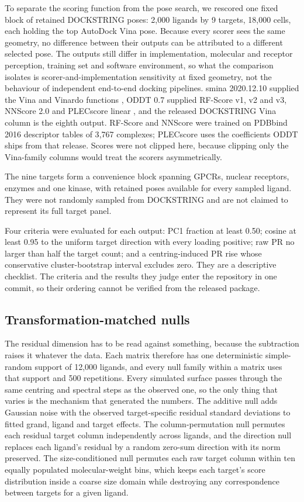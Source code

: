 To separate the scoring function from the pose search, we rescored one fixed block of retained
DOCKSTRING poses: 2{,}000 ligands by 9 targets, 18{,}000 cells, each holding the top AutoDock
Vina pose. Because every scorer sees the same geometry, no difference between their outputs
can be attributed to a different selected pose. The outputs still differ in implementation,
molecular and receptor perception, training set and software environment, so what the
comparison isolates is scorer-and-implementation sensitivity at fixed geometry, not the
behaviour of independent end-to-end docking pipelines. smina 2020.12.10 supplied
the Vina and Vinardo functions \cite{smina2013,vinardo2016}, ODDT 0.7 supplied RF-Score v1, v2
and v3, NNScore 2.0 and PLECscore linear
\cite{oddt2015,rfscore2010,ballester2014rfscore,nnscore2011,plecscore2019}, and the released
DOCKSTRING Vina column is the eighth output. RF-Score and NNScore were trained on PDBbind 2016
descriptor tables of 3{,}767 complexes; PLECscore uses the coefficients ODDT ships from that
release. Scores were not clipped here, because clipping only the Vina-family columns would treat
the scorers asymmetrically.

The nine targets form a convenience block spanning GPCRs, nuclear receptors, enzymes and one
kinase, with retained poses available for every sampled ligand. They were not randomly sampled from
DOCKSTRING and are not claimed to represent its full target panel.

Four criteria were evaluated for each output: PC1 fraction at least 0.50; cosine at least 0.95 to
the uniform target direction with every loading positive; raw PR no larger than half the target
count; and a centring-induced PR rise whose conservative cluster-bootstrap interval excludes
zero. They are a descriptive checklist. The criteria and the results they judge enter the
repository in one commit, so their ordering cannot be verified from the released package.

\subsection{Transformation-matched nulls}

The residual dimension has to be read against something, because the subtraction raises it
whatever the data. Each matrix therefore has one deterministic simple-random support of 12{,}000
ligands, and every null family within a matrix uses that support and 500 repetitions. Every
simulated surface passes through the same centring and spectral steps as the observed one, so
the only thing that varies is the mechanism that generated the numbers. The additive null adds
Gaussian noise with the observed target-specific residual standard deviations to fitted grand,
ligand and target effects. The column-permutation null permutes each residual target column
independently across ligands, and the direction null replaces each ligand's residual by a random
zero-sum direction with its norm preserved. The size-conditioned null permutes each raw target
column within ten equally populated molecular-weight bins, which keeps each target's score
distribution inside a coarse size domain while destroying any correspondence between targets for
a given ligand.

